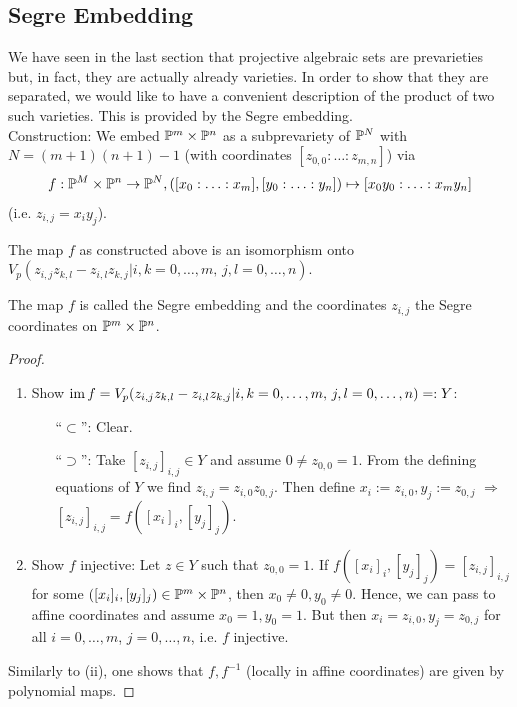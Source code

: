 \documentclass[a4paper,11pt]{article}
\begin{document}
		
		\subsection{Segre Embedding}

			\noindent We have seen in the last section that projective algebraic sets are prevarieties but, in fact, they are actually already varieties. In order to show that they are separated, we would like to have a convenient description of the product of two such varieties. This is provided by the Segre embedding.
			\\

			\noindent Construction: We embed $\P^m\times\P^n$ as a subprevariety of $\P^N$ with $N=(m+1)(n+1)-1$ (with coordinates $[z_{0,0}:\ldots:z_{m,n}]$) via
			\begin{equation*}
				f:\P^M\times\P^n\rightarrow\P^N,(\x{m},[y_0:\ldots:y_n])\mapsto[x_0y_0:\ldots:x_my_n]
			\end{equation*}
			(i.e. $z_{i,j}=x_iy_j$).

			\begin{prop}\label{prop--segre}
				The map $f$ as constructed above is an isomorphism onto $V_p(z_{i,j}z_{k,l}-z_{i,l}z_{k,j}|i,k=0,\dots,m,\,j,l=0,\dots,n)$.
			\end{prop}
			\noindent The map $f$ is called the Segre embedding and the coordinates $z_{i,j}$ the Segre coordinates on $\P^m\times\P^n$.
			\begin{proof}
				\begin{enumerate}
					\item Show $\im f=V_p(z_{i,j}z_{k,l}-z_{i,l}z_{k,j}|i,k=0,\dots,m,\,j,l=0,\dots,n)=:Y$:
					\begin{enumerate}
						\item [``$\subset$'':] Clear.
						\item [``$\supset$'':] Take $[z_{i,j}]_{i,j}\in Y$ and assume $0\neq z_{0,0}=1$. From the defining equations of $Y$ we find $z_{i,j}=z_{i,0}z_{0,j}$. Then define $x_i:=z_{i,0},y_j:=z_{0,j}$ $\Longrightarrow$ $[z_{i,j}]_{i,j}=f([x_i]_i,[y_j]_j)$.
					\end{enumerate}
					\item Show $f$ injective: Let $z\in Y$ such that $z_{0,0}=1$. If $f([x_i]_i,[y_j]_j)=[z_{i,j}]_{i,j}$ for some $([x_i]_i,[y_j]_j)\in\P^m\times\P^n$, then $x_0\neq0,y_0\neq0$. Hence, we can pass to affine coordinates and assume $x_0=1,y_0=1$. But then $x_i=z_{i,0},y_j=z_{0,j}$ for all $i=0,\dots,m$, $j=0,\dots,n$, i.e. $f$ injective.
				\end{enumerate}
				Similarly to (ii), one shows that $f,f^{-1}$ (locally in affine coordinates) are given by polynomial maps.
			\end{proof}
\end{document}

